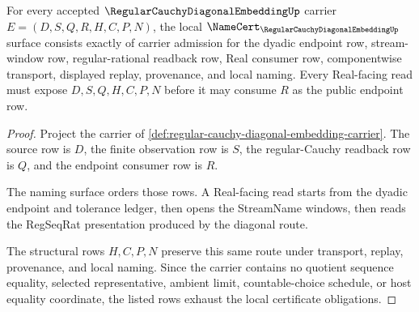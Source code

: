 \begin{theorem}
\label{thm:regular-cauchy-diagonal-embedding-namecert-obligations}
For every accepted $\RegularCauchyDiagonalEmbeddingUp$ carrier $E=(D,S,Q,R,H,C,P,N)$, the local $\NameCert_{\RegularCauchyDiagonalEmbeddingUp}$ surface consists exactly of carrier admission for the dyadic endpoint row, stream-window row, regular-rational readback row, Real consumer row, componentwise transport, displayed replay, provenance, and local naming. Every Real-facing read must expose $D,S,Q,H,C,P,N$ before it may consume $R$ as the public endpoint row.
\end{theorem}
\begin{proof}
Project the carrier of \autoref{def:regular-cauchy-diagonal-embedding-carrier}. The source row is $D$, the finite observation row is $S$, the regular-Cauchy readback row is $Q$, and the endpoint consumer row is $R$.

The naming surface orders those rows. A Real-facing read starts from the dyadic endpoint and tolerance ledger, then opens the StreamName windows, then reads the RegSeqRat presentation produced by the diagonal route.

The structural rows $H,C,P,N$ preserve this same route under transport, replay, provenance, and local naming. Since the carrier contains no quotient sequence equality, selected representative, ambient limit, countable-choice schedule, or host equality coordinate, the listed rows exhaust the local certificate obligations.
\end{proof}


